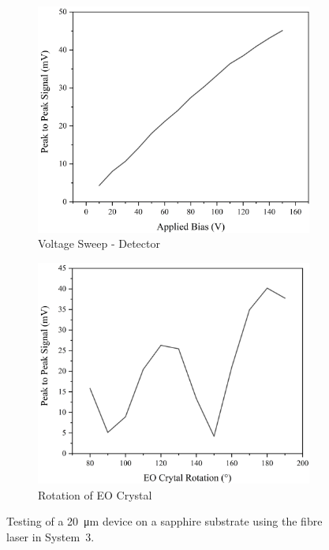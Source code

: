 \begin{figure}[ht]
\begin{subfigure}{0.49\textwidth}
\centering
\includegraphics[width=\textwidth]{Figures/Misc/SysDev/NBVoltE63G.png}
\caption{Voltage Sweep - Detector}
\label{fig:NBVoltE63G}
\end{subfigure}
\begin{subfigure}{0.49\textwidth}
\centering
\includegraphics[width=\textwidth]{Figures/Misc/SysDev/A20umEORotG.png}
\caption{Rotation of EO Crystal}
\label{fig:A20umEORotG}
\end{subfigure}

\captionsetup{font = footnotesize, justification = centering}
\caption[Testing of a \SI{20}{\micro\metre} Device on a Sapphire Substrate using the Fibre Laser]{Testing of a \SI{20}{\micro\metre} device on a sapphire substrate using the fibre laser in System~3.}
\label{Fig:fiblaser}
\end{figure}

